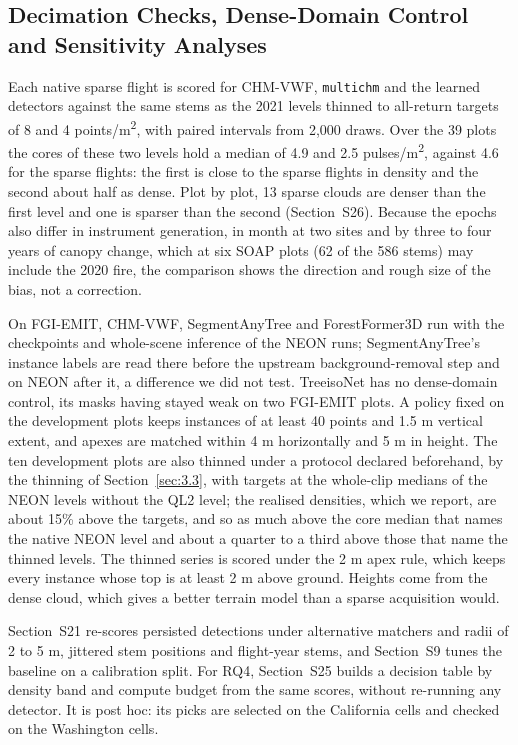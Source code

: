 \documentclass[journal]{IEEEtran}
\begin{document}
\subsection{Decimation Checks, Dense-Domain Control and Sensitivity Analyses}\label{sec:4.6}

Each native sparse flight is scored for CHM-VWF, \texttt{multichm} and the learned
detectors against the same stems as the 2021 levels thinned to all-return
targets of 8 and 4 points/m\textsuperscript{2}, with paired intervals from 2,000 draws. Over the
39 plots the cores of these two levels hold a median of 4.9 and 2.5 pulses/m\textsuperscript{2},
against 4.6 for the sparse flights: the first is close to the sparse flights in
density and the second about half as dense. Plot by plot, 13 sparse clouds are
denser than the first level and one is sparser than the second (Section~S26).
Because the epochs also differ in instrument generation, in month at two sites
and by three to four years of canopy change, which at six SOAP plots (62 of the
586 stems) may include the 2020 fire, the comparison shows the direction and
rough size of the bias, not a correction.

On FGI-EMIT, CHM-VWF, SegmentAnyTree and ForestFormer3D run with the checkpoints
and whole-scene inference of the NEON runs; SegmentAnyTree's instance labels are
read there before the upstream background-removal step and on NEON after it, a
difference we did not test. TreeisoNet has no dense-domain control, its masks
having stayed weak on two FGI-EMIT plots. A policy fixed on the development
plots keeps instances of at least 40 points and 1.5 m vertical extent, and
apexes are matched within 4 m horizontally and 5 m in height. The ten
development plots are also thinned under a protocol declared beforehand, by the
thinning of Section~\ref{sec:3.3}, with targets at the whole-clip medians of the NEON
levels without the QL2 level; the realised densities, which we report, are about
15\% above the targets, and so as much above the core median that names the
native NEON level and about a quarter to a third above those that name the
thinned levels. The thinned series is scored under the 2 m apex rule, which
keeps every instance whose top is at least 2 m above ground. Heights come
from the dense cloud, which gives a better terrain model than a sparse
acquisition would.

Section~S21 re-scores persisted detections under alternative matchers and radii
of 2 to 5 m, jittered stem positions and flight-year stems, and Section~S9 tunes
the baseline on a calibration split. For RQ4, Section~S25 builds a decision
table by density band and compute budget from the same scores, without
re-running any detector. It is post hoc: its picks are selected on the
California cells and checked on the Washington cells.
\end{document}
